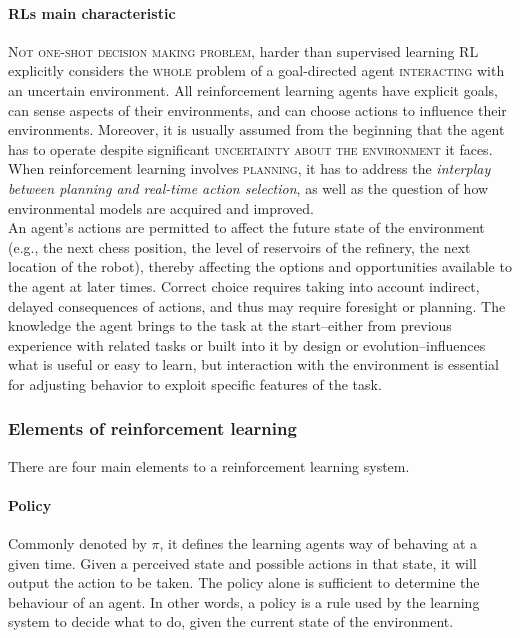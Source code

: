 \documentclass[11pt]{article}
\begin{document}
\paragraph{RLs main characteristic}
\textsc{Not one-shot decision making problem}, harder than supervised learning
RL explicitly considers the \textsc{whole} problem of a goal-directed agent \textsc{interacting} with an uncertain environment. All reinforcement learning agents have explicit goals, can sense aspects of their environments, and can choose actions to influence their environments. Moreover, it is usually assumed from the beginning that the agent has to operate despite significant \textsc{uncertainty about the environment} it faces. When reinforcement learning involves \textsc{planning}, it has to address the \textit{interplay between planning and real-time action selection}, as well as the question of how environmental models are acquired and improved.\\
An agent's actions are permitted to affect the future state of the environment (e.g., the next chess position, the level of reservoirs of the refinery, the next location of the robot), thereby affecting the options and opportunities available to the agent at later times. Correct choice requires taking into account indirect, delayed consequences of actions, and thus may require foresight or planning. The knowledge the agent brings to the task at the start--either from previous experience with related tasks or built into it by design or evolution--influences what is useful or easy to learn, but interaction with the environment is essential for adjusting behavior to exploit specific features of the task.

\subsubsection{Elements of reinforcement learning}
There are four main elements to a reinforcement learning system.

\paragraph{Policy}
Commonly denoted by $\pi$, it defines the learning agents way of behaving at a given time. Given a perceived state and possible actions in that state, it will output the action to be taken. The policy alone is sufficient to determine the behaviour of an agent. In other words, a policy is a rule used by the learning system to decide what to do, given the current state of the environment.
\end{document}
